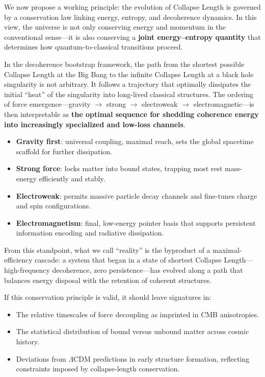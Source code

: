 \documentclass[
]{article}
\providecommand{\tightlist}{%
  \setlength{\itemsep}{0pt}\setlength{\parskip}{0pt}}
\begin{document}
We now propose a working principle: the evolution of Collapse Length is
governed by a conservation law linking energy, entropy, and decoherence
dynamics. In this view, the universe is not only conserving energy and
momentum in the conventional sense---it is also conserving a
\textbf{joint energy--entropy quantity} that determines how
quantum-to-classical transitions proceed.

In the decoherence bootstrap framework, the path from the shortest
possible Collapse Length at the Big Bang to the infinite Collapse Length
at a black hole singularity is not arbitrary. It follows a trajectory
that optimally dissipates the initial ``heat'' of the singularity into
long-lived classical structures. The ordering of force
emergence---gravity \(\to\) strong \(\to\) electroweak \(\to\)
electromagnetic---is then interpretable as \textbf{the optimal sequence
for shedding coherence energy into increasingly specialized and low-loss
channels}.

\begin{itemize}
\tightlist
\item
  \textbf{Gravity first}: universal coupling, maximal reach, sets the
  global spacetime scaffold for further dissipation.
\item
  \textbf{Strong force}: locks matter into bound states, trapping most
  rest mass-energy efficiently and stably.
\item
  \textbf{Electroweak}: permits massive particle decay channels and
  fine-tunes charge and spin configurations.
\item
  \textbf{Electromagnetism}: final, low-energy pointer basis that
  supports persistent information encoding and radiative dissipation.
\end{itemize}

From this standpoint, what we call ``reality'' is the byproduct of a
maximal-efficiency cascade: a system that began in a state of shortest
Collapse Length---high-frequency decoherence, zero persistence---has
evolved along a path that balances energy disposal with the retention of
coherent structures.

If this conservation principle is valid, it should leave signatures in:

\begin{itemize}
\tightlist
\item
  The relative timescales of force decoupling as imprinted in CMB
  anisotropies.
\item
  The statistical distribution of bound versus unbound matter across
  cosmic history.
\item
  Deviations from \(\Lambda\)CDM predictions in early structure
  formation, reflecting constraints imposed by collapse-length
  conservation.
\end{itemize}
\end{document}
